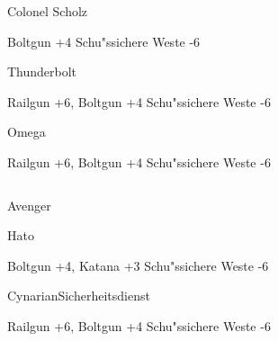 \begin{column}[l]{0.45}
    \begin{nscsheet}[h]{Colonel Scholz}
        \nscstats[ATT=5,AGG=4,EMP=4,KNO=3,HP=12]
        \nscruler
        \begin{nscinventory}
            \nscitem[Waffen] Boltgun +4
            \nscitem[R"ustung] Schu"ssichere Weste -6
        \end{nscinventory}
    \end{nscsheet}

    \begin{nscsheet}[h]{Thunderbolt}
        \nscstats[ATT=9,AGG=8,EMP=2,KNO=4,HP=14]
        \nscruler
        \begin{nscinventory}
            \nscitem[Waffen] Railgun +6, Boltgun +4
            \nscitem[R"ustung] Schu"ssichere Weste -6           
        \end{nscinventory}
    \end{nscsheet}

    \begin{nscsheet}[h]{Omega}
        \nscstats[ATT=8,AGG=8,EMP=1,KNO=2,HP=12]
        \nscruler
        \begin{nscinventory}
            \nscitem[Waffen] Railgun +6, Boltgun +4
            \nscitem[R"ustung] Schu"ssichere Weste -6           
        \end{nscinventory}
    \end{nscsheet}    
\end{column}
\begin{column}[r]{0.45}
    \begin{nscsheet}[h]{Avenger}
        \nscstats[ATT=5,AGG=5,EMP=4,KNO=3,HP=12]
        \nscruler
    \end{nscsheet}
    
    \begin{nscsheet}[h]{Hato}
        \nscstats[ATT=9,AGG=8,EMP=1,KNO=2,HP=14]
        \nscruler
        \begin{nscinventory}
            \nscitem[Waffen] Boltgun +4, Katana +3
            \nscitem[R"ustung] Schu"ssichere Weste -6          
        \end{nscinventory}
    \end{nscsheet}

    \begin{nscsheet}[h]{Cynarian\newline{}Sicherheitsdienst}
        \nscstats[ATT=6,AGG=5,EMP=2,KNO=4,HP=12]
        \nscruler
        \begin{nscinventory}
            \nscitem[Waffen] Railgun +6, Boltgun +4
            \nscitem[R"ustung] Schu"ssichere Weste -6           
        \end{nscinventory}
    \end{nscsheet}    
\end{column}


